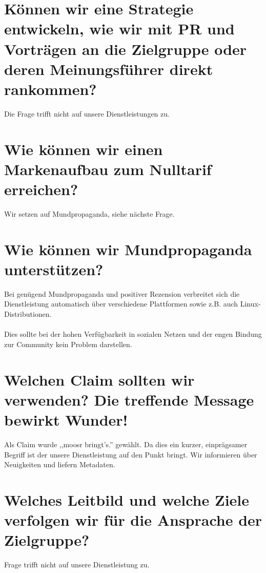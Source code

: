 \section{Können wir eine Strategie entwickeln, wie wir mit PR und Vorträgen an die Zielgruppe oder deren Meinungsführer direkt rankommen?}
Die Frage trifft nicht auf unsere Dienstleistungen zu.

\section{Wie können wir einen Markenaufbau zum Nulltarif erreichen?}
Wir setzen auf Mundpropaganda, siehe nächste Frage.

\section{Wie können wir Mundpropaganda unterstützen?}
Bei genügend Mundpropaganda und positiver Rezension verbreitet sich die
Dienstleistung automatisch über verschiedene Plattformen sowie z.B. auch Linux-Distributionen.
\\
\\
Dies sollte bei der hohen Verfügbarkeit in sozialen Netzen und der engen Bindung
zur Community kein Problem darstellen.

\section{Welchen Claim sollten wir verwenden? Die treffende Message bewirkt Wunder!}
Als Claim wurde ,,moosr bringt's.'' gewählt. Da dies ein kurzer, einprägsamer
Begriff ist der unsere Dienstleistung auf den Punkt bringt. Wir informieren über
Neuigkeiten und liefern Metadaten.

\section{Welches Leitbild und welche Ziele verfolgen wir für die Ansprache der Zielgruppe?}
Frage trifft nicht auf unsere Dienstleistung zu.
